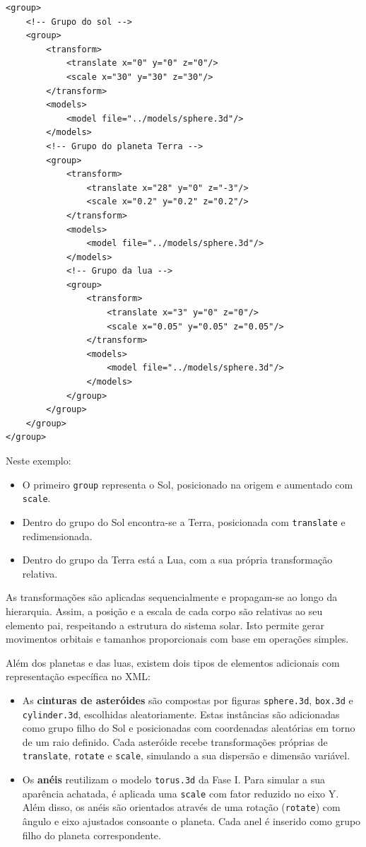 \documentclass[12pt, a4paper]{article}
\begin{document}
\begin{lstlisting}
<group>
    <!-- Grupo do sol -->
    <group>
        <transform>
            <translate x="0" y="0" z="0"/>
            <scale x="30" y="30" z="30"/>
        </transform>
        <models>
            <model file="../models/sphere.3d"/>
        </models>
        <!-- Grupo do planeta Terra -->
        <group>
            <transform>
                <translate x="28" y="0" z="-3"/>
                <scale x="0.2" y="0.2" z="0.2"/>
            </transform>
            <models>
                <model file="../models/sphere.3d"/>
            </models>
            <!-- Grupo da lua -->
            <group>
                <transform>
                    <translate x="3" y="0" z="0"/>
                    <scale x="0.05" y="0.05" z="0.05"/>
                </transform>
                <models>
                    <model file="../models/sphere.3d"/>
                </models>
            </group>
        </group>
    </group>
</group>
\end{lstlisting}

Neste exemplo:
\begin{itemize}
    \item O primeiro \texttt{group} representa o Sol, posicionado na origem e aumentado com
    \texttt{scale}.
    \item Dentro do grupo do Sol encontra-se a Terra, posicionada com \texttt{translate} e
    redimensionada.
    \item Dentro do grupo da Terra está a Lua, com a sua própria transformação relativa.
\end{itemize}

As transformações são aplicadas sequencialmente e propagam-se ao longo da hierarquia. Assim, a
posição e a escala de cada corpo são relativas ao seu elemento pai, respeitando a estrutura do
sistema solar. Isto permite gerar movimentos orbitais e tamanhos proporcionais com base em
operações simples.

Além dos planetas e das luas, existem dois tipos de elementos adicionais com representação
específica no XML:

\begin{itemize}
    \item As \textbf{cinturas de asteróides} são compostas por figuras \texttt{sphere.3d},
    \texttt{box.3d} e \texttt{cylinder.3d}, escolhidas aleatoriamente. Estas instâncias são
    adicionadas como grupo filho do Sol e posicionadas com coordenadas aleatórias em torno de um
    raio definido. Cada asteróide recebe transformações próprias de \texttt{translate},
    \texttt{rotate} e \texttt{scale}, simulando a sua dispersão e dimensão variável.

    \item Os \textbf{anéis} reutilizam o modelo \texttt{torus.3d} da Fase I. Para
    simular a sua aparência achatada, é aplicada uma \texttt{scale} com fator reduzido no eixo
Y.
    Além disso, os anéis são orientados através de uma rotação (\texttt{rotate}) com
ângulo e
    eixo ajustados consoante o planeta. Cada anel é inserido como grupo filho do planeta
    correspondente.
\end{itemize}
\end{document}
